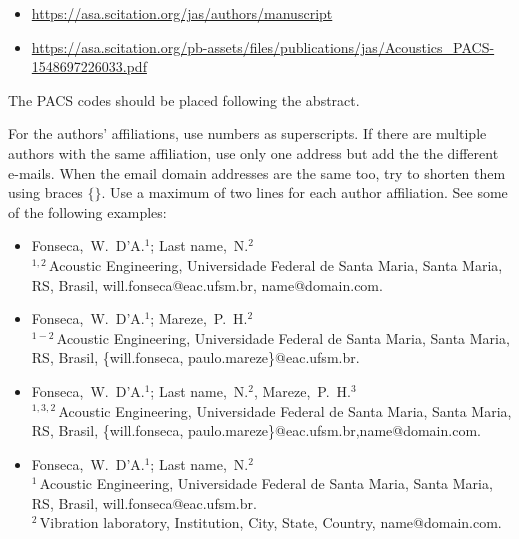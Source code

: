 \documentclass[12pt, a4paper, twoside, twocolumn]{article}
\begin{document}
\begin{itemize}[noitemsep,topsep=-1ex] \itemsep=8pt
	\item \url{https://asa.scitation.org/jas/authors/manuscript}
	\item \url{https://asa.scitation.org/pb-assets/files/publications/jas/Acoustics_PACS-1548697226033.pdf}
\end{itemize}

The PACS codes should be placed following the abstract.

For the authors' affiliations, use numbers as superscripts. If there are multiple authors with the same affiliation, use only one address but add the the different e-mails. When the email domain  addresses are the same too, try to shorten them using braces $\{ \}$. Use a maximum of two lines for each author affiliation. See some of the following examples:
%
\begin{flushleft}
\vspace{-0.5\baselineskip}
\begin{itemize}[topsep=-1ex,align=left,leftmargin=0.2cm] \itemsep=4pt

	\item Fonseca,~W.~D'A.$^1$; Last name,~N.$^2$\\[6pt]	
	$^{1,2}$\,Acoustic Engineering, Universidade Federal de Santa Maria, Santa Maria, RS, Brasil,\linebreak 
	 will.fonseca@eac.ufsm.br, name@domain.com.
	
	\item Fonseca,~W.~D'A.$^1$; Mareze,~P.~H.$^2$\\[6pt]	
	$^{1-2}$\,Acoustic Engineering, Universidade Federal de Santa Maria, Santa Maria, RS, Brasil,
	\{will.fonseca, paulo.mareze\}@eac.ufsm.br.
	
	\item Fonseca,~W.~D'A.$^1$; Last name,~N.$^2$, Mareze,~P.~H.$^3$\\[6pt]	
	$^{1,3,2}$\,Acoustic Engineering, Universidade Federal de Santa Maria, Santa Maria, RS, Brasil,
	\{will.fonseca, paulo.mareze\}@eac.ufsm.br,\linebreak name@domain.com.

	\item Fonseca,~W.~D'A.$^1$; Last name,~N.$^2$\\[6pt]	
	$^{1}$\,Acoustic Engineering, Universidade Federal de Santa Maria, Santa Maria, RS, Brasil,
	will.fonseca@eac.ufsm.br.\\[4pt]		
	$^2$\,Vibration laboratory, Institution, City, State, Country, name@domain.com.	
\end{itemize}
\vspace{-0.4\baselineskip}
\end{flushleft}
\end{document}
